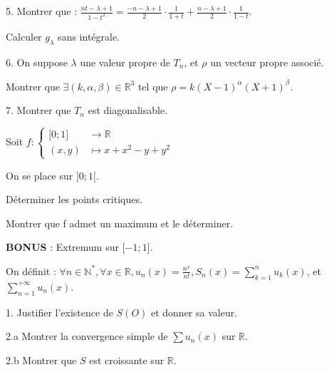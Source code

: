 \vspace{5pt}
5. Montrer que :
$\displaystyle \frac {nt - \lambda + 1} {1 - t^2} = \frac {-n - \lambda + 1} {2} \cdot \frac {1} {1 + t}
+ \frac {n - \lambda + 1} {2} \cdot \frac {1} {1 - t}$.

Calculer $g_\lambda$ sans intégrale.

\vspace{5pt}
6. On suppose $\lambda$ une valeur propre de $T_n$, et $\rho$ un vecteur propre associé.

Montrer que $\exists (k, \alpha, \beta) \in \mathbb{R}^3$ tel que $\rho = k(X-1)^\alpha(X+1)^\beta$.

\vspace{5pt}
7. Montrer que $T_n$ est diagonalisable.



\subetoiles



\noindent Soit $f : 
\begin{cases}
  \lbrack 0; 1 \rbrack & \longrightarrow \mathbb{R} \\    
  (x,y) & \longmapsto x + x^2 - y + y^2
\end{cases}
$

\vspace{5pt}
\noindent On se place sur $\rbrack 0; 1 \lbrack$.

\vspace{5pt}
Déterminer les points critiques.

\vspace{5pt}
Montrer que f admet un maximum et le déterminer.

\vspace{5pt}
{\bfseries BONUS} : Extremum sur $\lbrack -1; 1 \rbrack$.



\subetoiles
\columnbreak



\noindent On définit : $\displaystyle \forall n \in \mathbb{N}^*, \forall x \in \mathbb{R},
u_n(x) = \frac {n^x} {n!}, S_n(x) = \sum_{k=1}^{n}u_k(x)$, et $ \displaystyle \sum_{n=1}^{+\infty}u_n(x)$.

\vspace{5pt}
1. Justifier l'existence de $S(O)$ et donner sa valeur.

\vspace{5pt}
2.a Montrer la convergence simple de $\sum u_n(x)$ sur $\mathbb{R}$.

\vspace{5pt}
2.b Montrer que $S$ est croissante sur $\mathbb{R}$.


